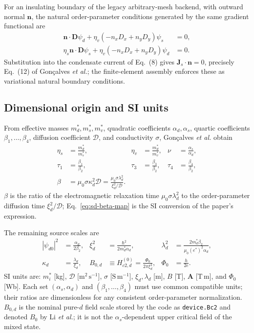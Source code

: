 \documentclass[11pt]{article}
\begin{document}
For an insulating boundary of the legacy arbitrary-mesh backend, with outward
normal $\mathbf n$, the natural
order-parameter conditions generated by the same gradient functional are
\begin{align}
  \mathbf n\!\cdot\!\mathbf D\psi_d
    +\eta_v(-n_xD_x+n_yD_y)\psi_s&=0,\\
  \eta_s\mathbf n\!\cdot\!\mathbf D\psi_s
    +\eta_v(-n_xD_x+n_yD_y)\psi_d&=0.
\end{align}
Substitution into the condensate current of Eq.~(8) gives
$\mathbf J_s\!\cdot\!\mathbf n=0$, precisely Eq.~(12) of Gon\c{c}alves
\textit{et al.}; the finite-element assembly enforces these as variational
natural boundary conditions.

\subsection{Dimensional origin and SI units}

From effective masses $m_d^*,m_s^*,m_v^*$, quadratic coefficients
$\alpha_d,\alpha_s$, quartic coefficients $\beta_1,\ldots,\beta_4$, diffusion
coefficient $\mathcal D$, and conductivity $\sigma$, Gon\c{c}alves
\textit{et al.} obtain~\cite{Goncalves2014}
\begin{align}
    \eta_s&=\frac{m_d^*}{m_s^*}, &
    \eta_v&=\frac{m_d^*}{m_v^*}, &
    \nu&=\frac{\alpha_s}{\alpha_d},\\
    \tau_1&=\frac{\beta_1}{\beta_2}, &
    \tau_3&=\frac{\beta_3}{\beta_2}, &
    \tau_4&=\frac{\beta_4}{\beta_2},
    \label{eq:sd-parameter-map}\\
    \beta
      &=\mu_0\sigma\kappa_d^2\mathcal D
       =\frac{\mu_0\sigma\lambda_d^2}
              {\xi_d^2/\mathcal D}.
    \label{eq:sd-beta-map}
\end{align}
$\beta$ is the ratio of the electromagnetic relaxation time
$\mu_0\sigma\lambda_d^2$ to the order-parameter diffusion time
$\xi_d^2/\mathcal D$; Eq.~\eqref{eq:sd-beta-map} is the SI conversion of the
paper's expression.

The remaining source scales are
\begin{align}
    |\psi_{d0}|^2&=\frac{\alpha_d}{2\beta_2}, &
    \xi_d^2&=\frac{\hbar^2}{2m_d^*\alpha_d}, &
    \lambda_d^2&=\frac{2m_d^*\beta_2}
        {\mu_0(e^*)^2\alpha_d},\\
    \kappa_d&=\frac{\lambda_d}{\xi_d}, &
    B_{0,d}&\equiv H_{c2,d}^{(0)}=\frac{\Phi_0}{2\pi\xi_d^2}, &
    \Phi_0&=\frac{h}{2e}.
    \label{eq:sd-source-scales}
\end{align}
SI units are: $m_i^*$ [kg], $\mathcal D$ [$\mathrm{m^2\,s^{-1}}$], $\sigma$
[$\mathrm{S\,m^{-1}}$], $\xi_d,\lambda_d$ [m], $B$ [T], $\mathbf A$
[$\mathrm{T\,m}$], and $\Phi_0$ [Wb].  Each set
$(\alpha_s,\alpha_d)$ and $(\beta_1,\ldots,\beta_4)$ must use common compatible
units; their ratios are dimensionless for any consistent order-parameter
normalization.  $B_{0,d}$ is the nominal pure-$d$ field scale stored by the
code as \texttt{device.Bc2} and denoted $B_0$ by Li \textit{et al.}; it is not
the $\alpha_s$-dependent upper critical field of the mixed state.
\end{document}
